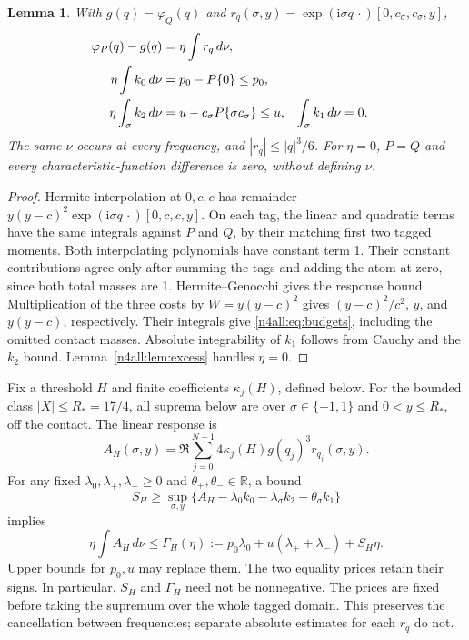 \documentclass[11pt,a4paper]{article}
\numberwithin{equation}{section}
\newtheorem{lemma}[theorem]{Lemma}
\theoremstyle{definition}
\theoremstyle{remark}
\newcommand{\R}{\mathbb R}
\newcommand{\ii}{\mathrm i}
\begin{document}
\begin{lemma}\label{n4all:lem:common-measure}
With $g(q)=\varphi_Q(q)$ and
$r_q(\sigma,y)=\exp(\ii\sigma q\,\cdot)[0,c_\sigma,c_\sigma,y]$,
\begin{align}
 \varphi_P(q)-g(q)&=\eta\int r_q\,d\nu,\notag\\
 \eta\int k_0\,d\nu&=p_0-P\{0\}\le p_0,\notag\\
 \eta\int_{\sigma}k_2\,d\nu&=u-c_\sigma P\{\sigma c_\sigma\}\le u,
 &\int_{\sigma}k_1\,d\nu&=0.\label{n4all:eq:budgets}
\end{align}
The same $\nu$ occurs at every frequency, and $|r_q|\le |q|^3/6$.
For $\eta=0$, $P=Q$ and every characteristic-function difference is
zero, without defining $\nu$.
\end{lemma}
\begin{proof}
Hermite interpolation at $0,c,c$ has remainder
$y(y-c)^2\exp(\ii\sigma q\,\cdot)[0,c,c,y]$.
On each tag, the linear and quadratic terms have the same integrals
against $P$ and $Q$, by their matching first two tagged moments.
Both interpolating polynomials have constant term 1. Their constant
contributions agree only after summing the tags and adding the atom
at zero, since both total masses are 1.
Hermite--Genocchi gives the response bound. Multiplication of the
three costs by $W=y(y-c)^2$ gives
$(y-c)^2/c^2$, $y$, and $y(y-c)$, respectively.
Their integrals give \eqref{n4all:eq:budgets}, including the omitted
contact masses. Absolute integrability of $k_1$ follows from Cauchy
and the $k_2$ bound. Lemma~\ref{n4all:lem:excess} handles $\eta=0$.
\end{proof}

Fix a threshold $H$ and finite coefficients $\kappa_j(H)$, defined
below. For the bounded class $|X|\le R_*=17/4$, all suprema below
are over $\sigma\in\{-1,1\}$ and $0<y\le R_*$, off the contact.
The linear response is
\[
 A_H(\sigma,y)=\Re\sum_{j=0}^{N-1}
        4\kappa_j(H)g(q_j)^3r_{q_j}(\sigma,y).
\]
For any fixed $\lambda_0,\lambda_+,\lambda_-\ge0$ and
$\theta_+,\theta_-\in\R$, a bound
\begin{equation}\label{n4all:eq:priced-supremum}
 S_H\ge\sup_{\sigma,y}
 \{A_H-\lambda_0k_0-\lambda_\sigma k_2-\theta_\sigma k_1\}
\end{equation}
implies
\begin{equation}\label{n4all:eq:gamma}
 \eta\int A_H\,d\nu\le
 \Gamma_H(\eta):=p_0\lambda_0+u(\lambda_++\lambda_-)+S_H\eta.
\end{equation}
Upper bounds for $p_0,u$ may replace them. The two equality prices
retain their signs. In particular, $S_H$ and $\Gamma_H$ need not be
nonnegative. The prices are fixed before taking the supremum over
the whole tagged domain. This preserves the cancellation between
frequencies; separate absolute estimates for each $r_q$ do not.
\end{document}
